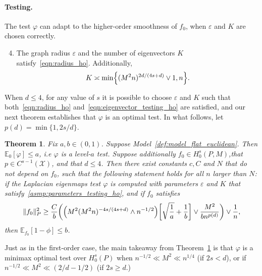 \documentclass{article}
\newcommand{\1}{\mathbf{1}}
\newcommand{\mc}[1]{\mathcal{#1}}
\newcommand{\Ebb}{\mathbb{E}}
\theoremstyle{alden}
\theoremstyle{aldenthm}
\newtheorem{theorem}{Theorem}
\theoremstyle{definition}
\theoremstyle{remark}
\begin{document}
\paragraph{Testing.} The test $\varphi$ can adapt to the higher-order smoothness of $f_0$, when $\varepsilon$ and $K$ are chosen correctly.
\begin{enumerate}[label=(A\arabic*)]
	\setcounter{enumi}{3}
	\item 
	\label{asmp:parameters_testing_ho}
	The graph radius $\varepsilon$ and the number of eigenvectors $K$ satisfy~\eqref{eqn:radius_ho}. Additionally,
	\begin{equation}
	\label{eqn:eigenvector_testing_ho}
	K \asymp \min\Bigl\{(M^2n)^{2d/(4s + d)} \vee 1, n\Bigr\}.
	\end{equation}
\end{enumerate}
When $d \leq 4$, for any value of $s$ it is possible to choose $\varepsilon$ and $K$ such that both~\eqref{eqn:radius_ho} and~\eqref{eqn:eigenvector_testing_ho} are satisfied, and our next theorem establishes that $\varphi$ is an optimal test. In what follows, let $p(d) = \min\{1,2s/d\}$. 
\begin{theorem}
	\label{thm:laplacian_eigenmaps_testing_ho}
	Fix $a,b \in (0,1)$. Suppose Model~\ref{def:model_flat_euclidean}. Then $\mathbb{E}_0[\varphi] \leq a$, i.e $\varphi$ is a level-$a$ test. Suppose additionally $f_0 \in H_0^s(P,M)$,that $p \in C^{s-1}(\mc{X})$, and that $d \leq 4$. Then there exist constants $c,C$ and $N$ that do not depend on $f_0$, such that the following statement holds for all $n$ larger than $N$: if the Laplacian eigenmaps test $\varphi$ is computed with parameters $\varepsilon$ and $K$ that satisfy~\ref{asmp:parameters_testing_ho}, and if $f_0$ satisfies
	\begin{equation}
	\label{eqn:laplacian_eigenmaps_testing_criticalradius_ho}
	\|f_0\|_P^2 \geq \frac{C}{b}\biggl(\Bigl(M^2(M^2n)^{-4s/(4s + d) } \wedge n^{-1/2}\Bigr)\biggl[\sqrt{\frac{1}{a}} + \frac{1}{b}\biggr] \vee \frac{M^2}{b n^{p(d)}} \biggr) \vee \frac{1}{n},
	\end{equation}
	then $\Ebb_{f_0}[1 - \phi] \leq b$.
\end{theorem}
Just as in the first-order case, the main takeaway from Theorem~\ref{thm:laplacian_eigenmaps_testing_ho} is that $\varphi$ is a minimax optimal test over $H_0^s(P)$ when $n^{-1/2} \ll M^2 \ll n^{1/4}$ (if $2s < d$), or if $n^{-1/2} \ll M^2 \ll (2/d - 1/2)$ (if $2s \geq d$.)
\end{document}
